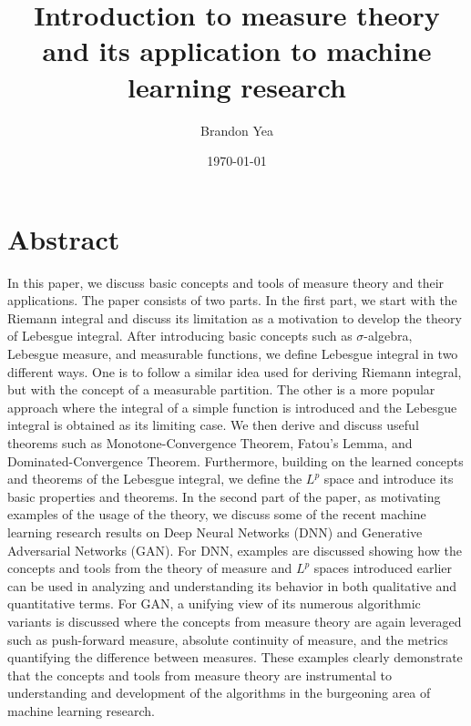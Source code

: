 \documentclass[12pt]{amsart}
\theoremstyle{plain}
\theoremstyle{definition}
\theoremstyle{remark}
\numberwithin{equation}{section}
\numberwithin{thm}{section}
\begin{document}
\newenvironment{cenmath}
{\begin{center}\begin{minipage}{\linewidth}\begin{eqnarray*}}
{\end{eqnarray*}\end{minipage}\end{center}}

\setlength{\parskip}{1em}



\title{Introduction to measure theory and its application to machine learning research}
\author{Brandon Yea}
\address{Euler Circle, Mountain View, CA 94040}
\date{\today}
\maketitle


\section{\textbf{Abstract}}

In this paper, we discuss basic concepts and tools of measure theory and their applications. The paper consists of two parts. In the first part, we start with the Riemann integral and discuss its limitation as a motivation to develop the theory of Lebesgue integral. After introducing basic concepts such as $\sigma$-algebra, Lebesgue measure, and measurable functions, we define Lebesgue integral in two different ways. One is to follow a similar idea used for deriving Riemann integral, but with the concept of a measurable partition. The other is a more popular approach where the integral of a simple function is introduced and the Lebesgue integral is obtained as its limiting case. We then derive and discuss useful theorems such as Monotone-Convergence Theorem, Fatou's Lemma, and Dominated-Convergence Theorem. Furthermore, building on the learned concepts and theorems of the Lebesgue integral, we define the $L^p$ space and introduce its basic properties and theorems. In the second part of the paper, as motivating examples of the usage of the theory, we discuss some of the recent machine learning research results on Deep Neural Networks (DNN) and Generative Adversarial Networks (GAN). For DNN, examples are discussed showing how the concepts and tools from the theory of measure and $L^p$ spaces introduced earlier can be used in analyzing and understanding its behavior in both qualitative and quantitative terms. For GAN, a unifying view of its numerous algorithmic variants is discussed where the concepts from measure theory are again leveraged such as push-forward measure, absolute continuity of measure, and the metrics quantifying the difference between measures. These examples clearly demonstrate that the concepts and tools from measure theory are instrumental to understanding and development of the algorithms in the burgeoning area of machine learning research.
\end{document}
